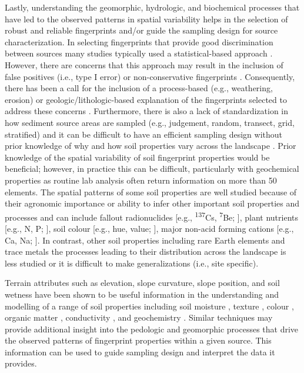 \documentclass[
  number]{elsarticle}
\begin{document}
Lastly, understanding the geomorphic, hydrologic, and biochemical
processes that have led to the observed patterns in spatial variability
helps in the selection of robust and reliable fingerprints and/or guide
the sampling design for source characterization. In selecting
fingerprints that provide good discrimination between sources many
studies typically used a statistical-based approach \citep{collins1997}.
However, there are concerns that this approach may result in the
inclusion of false positives (i.e., type I error) or non-conservative
fingerprints \citep{koiter2013}. Consequently, there has been a call for
the inclusion of a process-based (e.g., weathering, erosion) or
geologic/lithologic-based explanation of the fingerprints selected to
address these concerns \citep{collins2020}. Furthermore, there is also a
lack of standardization in how sediment source areas are sampled (e.g.,
judgement, random, transect, grid, stratified) and it can be difficult
to have an efficient sampling design without prior knowledge of why and
how soil properties vary across the landscape \citep{lunamiño2024}.
Prior knowledge of the spatial variability of soil fingerprint
properties would be beneficial; however, in practice this can be
difficult, particularly with geochemical properties as routine lab
analysis often return information on more than 50 elements. The spatial
patterns of some soil properties are well studied because of their
agronomic importance or ability to infer other important soil properties
and processes and can include fallout radionuclides {[}e.g.,
\textsuperscript{137}Cs, \textsuperscript{7}Be; \citep{ritchie1970}{]},
plant nutrients {[}e.g., N, P; \citep{vasu2017}{]}, soil colour {[}e.g.,
hue, value; \citep{viscarrarossel2006}{]}, major non-acid forming
cations {[}e.g., Ca, Na; \citep{sun2021}{]}. In contrast, other soil
properties including rare Earth elements and trace metals the processes
leading to their distribution across the landscape is less studied or it
is difficult to make generalizations (i.e., site specific).

Terrain attributes such as elevation, slope curvature, slope position,
and soil wetness have been shown to be useful information in the
understanding and modelling of a range of soil properties including soil
moisture \citep{beaudette2013}, texture \citep{kokulan2018}, colour
\citep{brown2004}, organic matter \citep{zhang2012}, conductivity
\citep{umali2012}, and geochemistry \citep{lima2023}. Similar techniques
may provide additional insight into the pedologic and geomorphic
processes that drive the observed patterns of fingerprint properties
within a given source. This information can be used to guide sampling
design and interpret the data it provides.
\end{document}
